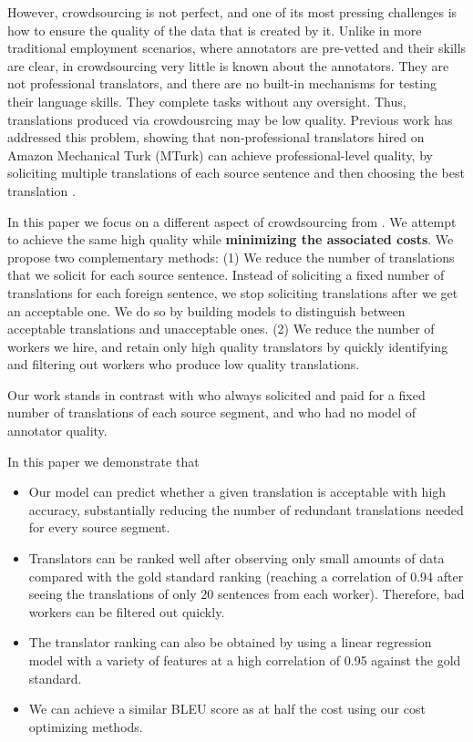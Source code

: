 \documentclass[11pt,letterpaper]{article}
\begin{document}
However, crowdsourcing is not perfect, and one of its most pressing challenges is how to ensure the quality of the data that is created by it.  Unlike in more traditional employment scenarios, where annotators are pre-vetted and their skills are clear, in crowdsourcing very little is known about the annotators.  They are not professional translators, and there are no built-in mechanisms for testing their language skills.  They complete tasks without any oversight. Thus, translations produced via crowdousrcing may be low quality.
Previous work has addressed this problem, showing that non-professional translators hired on Amazon Mechanical Turk (MTurk) can achieve professional-level quality, by soliciting multiple translations of each source sentence and then choosing the best translation \cite{zaidan-callisonburch:2011:ACL-HLT2011a}.

In this paper we focus on a different aspect of crowdsourcing from .  We attempt to achieve the same high quality while {\bf minimizing the associated costs}.  
We propose two complementary methods:
(1) We reduce the number of translations that we solicit for each source sentence. Instead of soliciting a fixed number of translations for each foreign sentence, we stop soliciting translations after we get an acceptable one.  We do so by building models to distinguish between acceptable translations and unacceptable ones. (2) We reduce the number of workers we hire, and retain only high quality translators by quickly identifying and filtering out workers who produce low quality translations. 
  

Our work stands in contrast with   who always solicited and paid for a fixed number of translations of each source segment, and who had no model of annotator quality. 
 
 In this paper we demonstrate that
 \begin{itemize}
 \item Our model can predict whether a given translation is acceptable with high accuracy, substantially reducing the number of redundant translations needed for every source segment.
 
\item Translators can be ranked well after observing only small amounts of data compared with the gold standard ranking (reaching a correlation of 0.94 after seeing the translations of only 20 sentences from each worker). Therefore, bad workers can be filtered out quickly. 
 
 \item The translator ranking can also be obtained by using a linear regression model with a variety of features at a high correlation of 0.95 against the gold standard. 
 
 
 \item We can achieve a similar BLEU score as  at half the cost using our cost optimizing methods.
 \end{itemize} 
 
\end{document}
